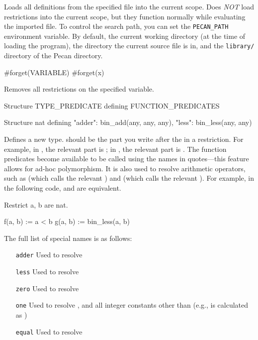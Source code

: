 Loads all definitions from the specified file into the current scope.
Does \emph{NOT} load restrictions into the current scope, but they function normally while evaluating the imported file.
To control the search path, you can set the \lstinline{PECAN_PATH} environment variable.
By default, the current working directory (at the time of loading the program), the directory the current source file is in, and the \lstinline{library/} directory of the Pecan directory.

\begin{pecan}
#forget(VARIABLE)
#forget(x)
\end{pecan}

Removes all restrictions on the specified variable.

\begin{pecan}
Structure TYPE_PREDICATE defining {
    FUNCTION_PREDICATES
}

Structure nat defining {
    "adder": bin_add(any, any, any),
    "less": bin_less(any, any)
}
\end{pecan}

Defines a new type.
 should be the part you write after the  in a restriction. For example, in , the relevant part is ; in , the relevant part is .
The function predicates become available to be called using the names in quotes---this feature allows for ad-hoc polymorphism.
It is also used to resolve arithmetic operators, such as \pecaninline{+} (which calls the relevant ) and \pecaninline{<} (which calls the relevant ).
For example, in the following code,  and  are equivalent.
\begin{pecan}
Restrict a, b are nat.

f(a, b) := a < b
g(a, b) := bin_less(a, b)
\end{pecan}

The full list of special names is as follows:

\begin{itemize}
    \item[\texttt{adder}] Used to resolve \pecaninline{+}
    
    \item[\texttt{less}] Used to resolve \pecaninline{<}
    
    \item[\texttt{zero}] Used to resolve 
    
    \item[\texttt{one}] Used to resolve , and all integer constants other than  (e.g.,  is calculated as )
    
    \item[\texttt{equal}] Used to resolve \pecaninline{=}
    
\end{itemize}

